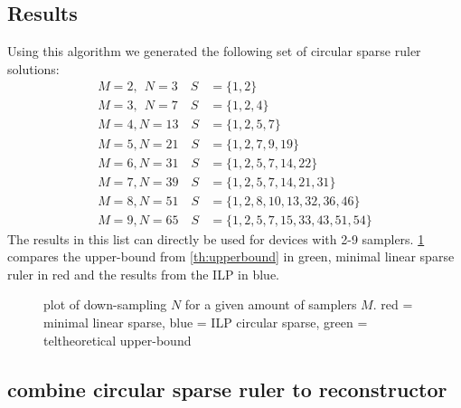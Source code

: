 \documentclass[a4paper, openany, oneside]{memoir}
\begin{document}
\subsection{Results}
Using this algorithm we generated the following set of circular sparse ruler solutions:
\begin{align}
M=2,\;\,N=3  \quad S&=\{1,2\}\\
M=3,\;\,N=7  \quad S&=\{1,2,4\}\\
M=4,N=13 \quad S&=\{1,2,5,7\}\\
M=5,N=21 \quad S&=\{1,2,7,9, 19\}\\
M=6,N=31 \quad S&=\{1,2,5,7,14,22\}\\
M=7,N=39 \quad S&=\{1,2,5,7,14,21,31\}\\
M=8,N=51 \quad S&=\{1,2,8,10,13,32,36, 46\}\\
M=9,N=65 \quad S&=\{1,2,5,7,15, 33, 43, 51, 54\}
\end{align}
The results in this list can directly be used for devices with 2-9 samplers. \cref{fig:comparison_sparse_ruler} compares the upper-bound from \cref{th:upperbound} in green, minimal linear sparse ruler in red and the results from the ILP in blue.
\begin{figure}[H]
\caption{plot of down-sampling $N$ for a given amount of samplers $M$. red = minimal linear sparse, blue = ILP circular sparse, green = teltheoretical upper-bound}\label{fig:comparison_sparse_ruler}
\end{figure}

\subsection{combine circular sparse ruler to reconstructor}\label{sub:ci-circ}
\end{document}
